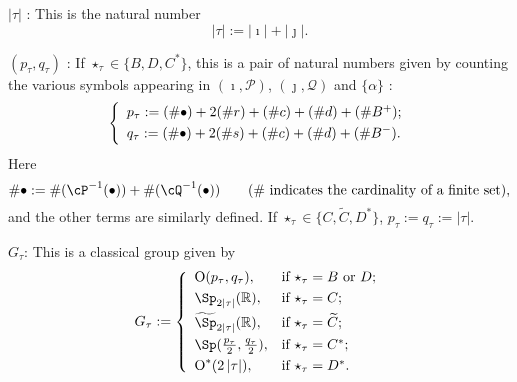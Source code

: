 \documentclass[12pt,a4paper]{amsart}
\def\abs#1{\left|{#1}\right|}
\newcommand{\CO}{{\mathcal {O}}}
\newcommand{\CP}{{\mathcal {P}}}
\newcommand{\CQ}{{\mathcal {Q}}}
\newcommand{\oO}{\operatorname{O}}
\newcommand{\R}{\mathbb R}
\numberwithin{equation}{section}
\theoremstyle{remark}
\begin{document}
 \noindent $\abs{\tau}$ : This is the natural number \[
  \abs{\tau}:=\abs{\imath}+\abs{\jmath}.
\]
\delete{Note that
\[
 \abs{\tau}= \left\{
     \begin{array}{ll}
        \frac{\abs{\check \CO}-1}{2}, &\hbox{if $\star_\tau=C$ or $C^*$}; \smallskip\\
          \frac{\abs{\check \CO}}{2}, &\hbox{otherwise}. \smallskip\\
                      \end{array}
   \right.
\]
}


 

 \smallskip


 \smallskip



  \noindent $(p_{\tau}, q_{\tau})$ : If $\star_\tau\in \{B, D, C^*\}$, this is a pair of natural numbers given by counting  the various symbols appearing in $(\imath, \CP)$, $(\jmath, \CQ)$ and $\{\alpha\}$ :
  \begin{equation}\label{ptqt}
  \left\{
     \begin{array}{l}
    p_\tau :=( \# \bullet)+ 2 (\# r) +(\# c )+ (\# d) + (\# B^+);\smallskip\\
    q_\tau :=( \# \bullet)+ 2 (\# s) + (\# c) + (\# d) + (\# B^-).\\
    \end{array}
    \right.
\end{equation}
Here 
\[
\#\bullet:=\#(\cP^{-1}(\bullet))+\#(\cQ^{-1}(\bullet))\qquad (\textrm{$\#$ indicates the cardinality of a finite set}),
\] 
and the other terms are similarly defined. 
If $\star_\tau\in \{C, \widetilde C, D^*\}$,  $p_\tau:=q_\tau:=\abs{\tau}$. 

\smallskip


 \smallskip


  \noindent $G_{\tau}$: This is a classical group given by
  \[
 G_\tau:= \left\{
     \begin{array}{ll}
         \oO(p_\tau, q_\tau), &\hbox{if $\star_\tau=B$ or $D$}; \smallskip\\
            \Sp_{2\abs{\tau}}(\R), &\hbox{if $\star_\tau=C$}; \smallskip\\
           \widetilde{\Sp}_{2\abs{\tau}}(\R), &\hbox{if $\star_\tau=\widetilde{ C}$}; \smallskip \\
        \Sp(\frac{p_\tau}{2}, \frac{q_\tau}{2}), &\hbox{if $\star_\tau=C^*$}; \smallskip \\
          \oO^*(2\abs{\tau}), &\hbox{if $\star_\tau=D^*$}.\\
            \end{array}
   \right.
\]
\end{document}
